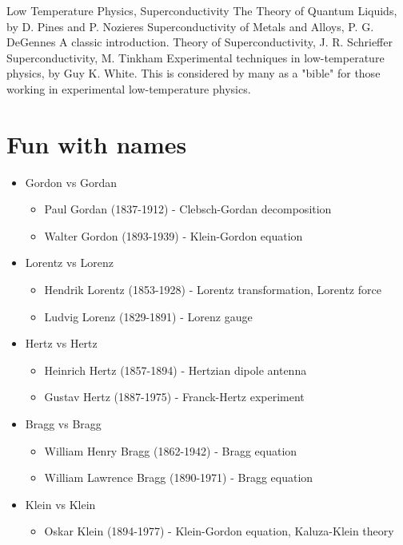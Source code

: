 \documentclass[10pt,a4paper]{book}
\theoremstyle{definition}
\begin{document}
Low Temperature Physics, Superconductivity
The Theory of Quantum Liquids, by D. Pines and P. Nozieres
Superconductivity of Metals and Alloys, P. G. DeGennes A classic introduction.
Theory of Superconductivity, J. R. Schrieffer
Superconductivity, M. Tinkham
Experimental techniques in low-temperature physics, by Guy K. White.
This is considered by many as a "bible" for those working in experimental low-temperature physics.





\newpage
\chapter{Fun with names}
\begin{itemize}
\item Gordon vs Gordan
    \begin{itemize}
    \item {\sc Paul Gordan} (1837-1912) - Clebsch-Gordan decomposition
    \item {\sc Walter Gordon} (1893-1939) - Klein-Gordon equation
    \end{itemize}
\item Lorentz vs Lorenz
    \begin{itemize}
    \item {\sc Hendrik Lorentz} (1853-1928) - Lorentz transformation, Lorentz force
    \item {\sc Ludvig Lorenz} (1829-1891) - Lorenz gauge
    \end{itemize}
\item Hertz vs Hertz
    \begin{itemize}
    \item {\sc Heinrich Hertz} (1857-1894) - Hertzian dipole antenna
    \item {\sc Gustav Hertz} (1887-1975) - Franck-Hertz experiment
    \end{itemize}
\item Bragg vs Bragg
    \begin{itemize}
    \item {\sc William Henry Bragg} (1862-1942) - Bragg equation
    \item {\sc William Lawrence Bragg} (1890-1971) - Bragg equation
    \end{itemize}
\item Klein vs Klein
    \begin{itemize}
    \item {\sc Oskar Klein} (1894-1977) - Klein-Gordon equation, Kaluza-Klein theory

\end{itemize}
\end{itemize}
\end{document}
